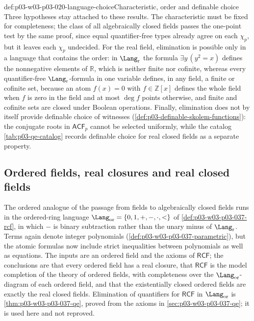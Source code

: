 \begin{hbwarning}{def:p03-w03-p03-020-language-choice}{Characteristic, order and definable choice}
Three hypotheses stay attached to these results. The characteristic must
be fixed for completeness; the class of all algebraically closed fields
passes the one-point test by the same proof, since equal quantifier-free
types already agree on each \(\chi_p\), but it leaves each \(\chi_p\)
undecided. For the real field, elimination is possible only in a language
that contains the order: in \(\Lang_{\mathrm r}\) the formula
\(\exists y\,(y^2=x)\) defines the nonnegative elements of \(\mathbb R\),
which is neither finite nor cofinite, whereas every quantifier-free
\(\Lang_{\mathrm r}\)-formula in one variable defines, in any field, a
finite or cofinite set, because an atom \(f(x)=0\) with
\(f\in\mathbb Z[x]\) defines the whole field when \(f\) is zero in the
field and at most \(\deg f\) points otherwise, and finite and cofinite
sets are closed under Boolean operations. Finally, elimination does not
by itself provide definable choice of witnesses
(\cref{def:p03-definable-skolem-functions}): the conjugate roots in
\(\mathsf{ACF}_p\) cannot be selected uniformly, while the catalog
\cref{tab:p03-qe-catalog} records definable choice for real closed fields
as a separate property.
\end{hbwarning}


\subsection{Ordered fields, real closures and real closed fields}
\label{sec:p03-w03-p03-020-rcf}

The ordered analogue of the passage from fields to algebraically closed
fields runs in the ordered-ring language
\(\Lang_{\mathrm{or}}=\{0,1,+,-,\mathbin{\cdot},<\}\) of
\cref{def:p03-w03-p03-037-rcf}, in which \(-\) is binary subtraction rather
than the unary minus of \(\Lang_{\mathrm r}\). Terms again denote integer
polynomials (\cref{def:p03-w03-p03-037-parametric}), but the atomic formulas
now include strict inequalities between polynomials as well as equations.
The inputs are an ordered field and the axioms of \(\mathsf{RCF}\); the
conclusions are that every ordered field has a real closure, that
\(\mathsf{RCF}\) is the model completion of the theory of ordered fields,
with completeness over the \(\Lang_{\mathrm{or}}\)-diagram of each ordered
field, and that the existentially closed ordered fields are exactly the real
closed fields. Elimination of quantifiers for \(\mathsf{RCF}\) in
\(\Lang_{\mathrm{or}}\) is \cref{thm:p03-w03-p03-037-qe}, proved from the
axioms in \cref{sec:p03-w03-p03-037-qe}; it is used here and not reproved.

